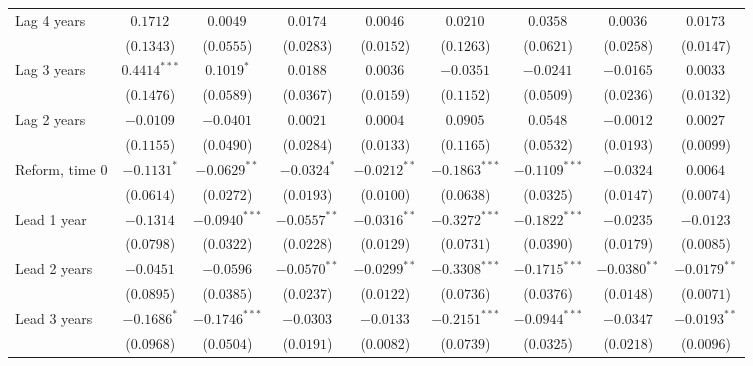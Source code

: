 \begin{landscape}
\begin{table}[htbp]
{\begin{tabular}{lcccccccc}
Lag 4 years &     $ 0.1712^{} $ &     $ 0.0049^{} $ &   $ 0.0174^{} $ &   $ 0.0046^{} $  &     $ 0.0210^{} $ &     $ 0.0358^{} $ &   $ 0.0036^{} $ &   $ 0.0173^{} $  \\
&     ($0.1343$) &     ($0.0555$) & ($0.0283$)& ($ 0.0152$)  &    ($0.1263$)   &   ($0.0621$) & ($0.0258$) & ($0.0147$)   \\
Lag 3 years &     $ 0.4414^{***} $ &     $ 0.1019^{*} $ &   $ 0.0188^{} $ &   $ 0.0036^{} $  &     $ -0.0351^{} $ &     $ -0.0241^{} $ &   $ -0.0165^{} $ &   $ 0.0033^{} $  \\
&     ($0.1476$) &     ($0.0589$) & ($0.0367$)& ($ 0.0159$)  &    ($0.1152$)   &   ($0.0509$) & ($0.0236$) & ($0.0132$)   \\
Lag 2 years &     $ -0.0109^{} $ &     $ -0.0401^{} $ &  $ 0.0021^{} $  &  $ 0.0004^{} $  &     $ 0.0905^{} $ &     $ 0.0548^{} $ &  $ -0.0012^{} $  &  $ 0.0027^{} $ \\
&     ($0.1155$) &     ($0.0490$) & ($0.0284$)& ($ 0.0133$)  &    ($0.1165$)   &   ($0.0532$) & ($0.0193$) & ($0.0099$)   \\
Reform, time 0 &     $ -0.1131^{*} $ &     $ -0.0629^{**} $ &   $ -0.0324^{*} $   &   $ -0.0212^{**} $  &     $ -0.1863^{***} $ &     $ -0.1109^{***} $ &   $ -0.0324^{} $   &   $ 0.0064^{} $ \\
&     ($0.0614$) &     ($0.0272$) & ($0.0193$)& ($ 0.0100$)  &    ($0.0638$)   &   ($0.0325$) & ($0.0147$) & ($0.0074$)   \\
Lead 1 year &     $ -0.1314^{} $ &     $ -0.0940^{***} $ &    $ -0.0557^{**} $ &    $ -0.0316^{**} $ &     $ -0.3272^{***} $ &     $ -0.1822^{***} $ &    $ -0.0235^{} $ &    $ -0.0123^{} $ \\
&     ($0.0798$) &     ($0.0322$) & ($0.0228$)& ($ 0.0129$)  &    ($0.0731$)   &   ($0.0390$) & ($0.0179$) & ($0.0085$)   \\
Lead 2 years &     $ -0.0451^{} $ &     $ -0.0596^{} $ &   $ -0.0570^{**} $  &   $ -0.0299^{**} $ &     $ -0.3308^{***} $ &     $ -0.1715^{***} $ &   $ -0.0380^{**} $  &   $ -0.0179^{**} $ \\
&     ($0.0895$) &     ($0.0385$) & ($0.0237$)& ($ 0.0122$)  &    ($0.0736$)   &   ($0.0376$) & ($0.0148$) & ($0.0071$)   \\
Lead 3 years &     $ -0.1686^{*} $ &     $ -0.1746^{***} $ &   $ -0.0303^{} $  &   $ -0.0133^{} $ &     $ -0.2151^{***} $ &     $ -0.0944^{***} $ &   $ -0.0347^{} $  &   $ -0.0193^{**} $ \\
&     ($0.0968$) &     ($0.0504$) & ($0.0191$)& ($ 0.0082$)  &    ($0.0739$)   &   ($0.0325$) & ($0.0218$) & ($0.0096$)   \\

\end{tabular}}
\end{table}
\end{landscape}
